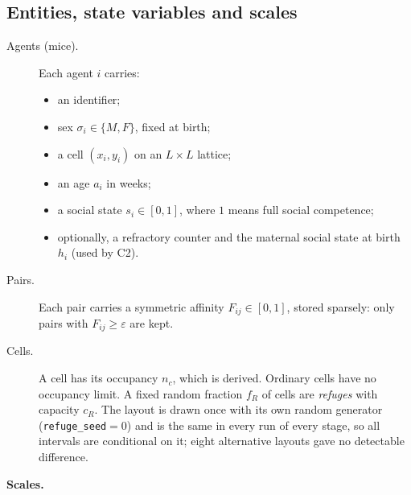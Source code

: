\subsection{Entities, state variables and scales}
\begin{description}
\item[Agents (mice).] Each agent $i$ carries:
  \begin{itemize}
  \item an identifier;
  \item sex $\sigma_i\in\{M,F\}$, fixed at birth;
  \item a cell $(x_i,y_i)$ on an $L\times L$ lattice;
  \item an age $a_i$ in weeks;
  \item a social state $s_i\in[0,1]$, where $1$ means full social competence;
  \item optionally, a refractory counter and the maternal social state at birth $h_i$ (used by \textsf{C2}).
  \end{itemize}
\item[Pairs.] Each pair carries a symmetric affinity $F_{ij}\in[0,1]$, stored sparsely: only pairs with
  $F_{ij}\ge\varepsilon$ are kept.
\item[Cells.] A cell has its occupancy $n_c$, which is derived. Ordinary cells have no occupancy limit. A fixed
  random fraction $f_R$ of cells are \emph{refuges} with capacity $c_R$. The layout is drawn once with its own random
  generator (\texttt{refuge\_seed}${}=0$) and is the same in every run of every stage, so all intervals are
  conditional on it; eight alternative layouts gave no detectable
  difference.
\end{description}
\textbf{Scales.}
